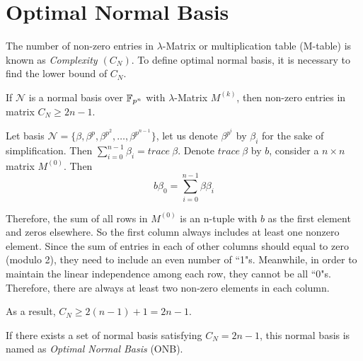 \section{Optimal Normal Basis}
\label{append:ONB}
The number of non-zero entries in $\lambda$-Matrix or multiplication table (M-table) is known as \emph{Complexity $(C_N)$}.
To define optimal normal basis, it is necessary to find the lower bound of $C_N$.
\begin{Theorem}
If $\mathcal{N}$ is a normal basis over ${\mathbb{F}}_{p^n}$ with $\lambda$-Matrix $M^{(k)}$, then non-zero entries in matrix $C_N\geq 2n-1$.
\end{Theorem}
\begin{Proof}
Let basis $\mathcal{N} = \{\beta, \beta^p, \beta^{p^2},\dots, \beta^{p^{n-1}}\}$, let us denote $\beta^{p^i}$ by $\beta_i$ for the sake of simplification.
Then $\sum_{i=0}^{n-1} \beta_i = trace\ \beta$. 
Denote $trace\ \beta$ by $b$, consider a $n\times n$ matrix $M^{(0)}$. Then
$$b\beta_0 = \sum_{i=0}^{n-1} \beta \beta_i$$

Therefore, the sum of all rows in $M^{(0)}$ is an n-tuple with $b$ as the first element and zeros elsewhere.
So the first column always includes at least one nonzero element. 
Since the sum of entries in each of other columns should equal to zero (modulo 2), they 
need to include an even number of ``1"s.
Meanwhile, in order to maintain the linear independence among each row, they cannot be all ``0"s. 
Therefore, there are always at least two non-zero elements in each column.

As a result, $C_N \geq 2(n-1)+1  = 2n-1$.
\end{Proof}

If there exists a set of normal basis satisfying $C_N = 2n - 1$, this normal basis is named as 
\emph{Optimal Normal Basis} (ONB).

